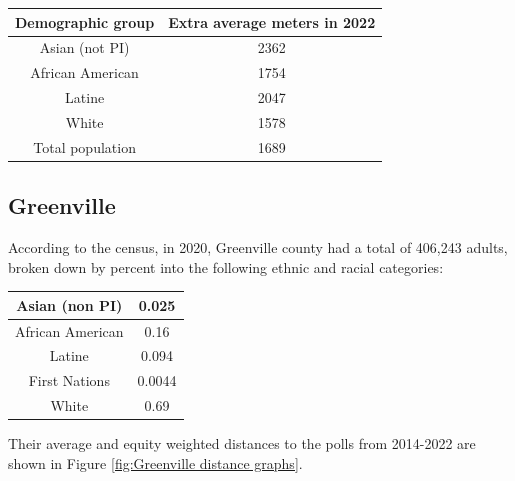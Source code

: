 \documentclass[11pt]{article}
\theoremstyle{remark}
\theoremstyle{definition}
\begin{document}
\begin{tabular}{|c|c|}
	\hline
	Demographic group & Extra average meters in 2022 \\ \hline
	Asian (not PI) &   2362 \\ \hline
	African American &   1754  \\ \hline
	Latine & 2047 \\ \hline
	White &  1578\\ \hline
	Total population &  1689\\ \hline
\end{tabular}


\subsection{Greenville \label{sec:Greenville distances}}
According to the census, in 2020, Greenville county had a total of 406,243 adults, broken down by percent into the following ethnic and racial categories:

\begin{tabular} {| c | c |} 
	\hline
	Asian (non PI) &  0.025 \\ \hline
	African American & 0.16 \\ \hline
	Latine & 0.094 \\ \hline
	First Nations & 0.0044 \\ \hline
	White  & 0.69 \\ \hline
\end{tabular}


Their average and equity weighted distances to the polls from 2014-2022 are shown in Figure \ref{fig:Greenville distance graphs}.
\end{document}
